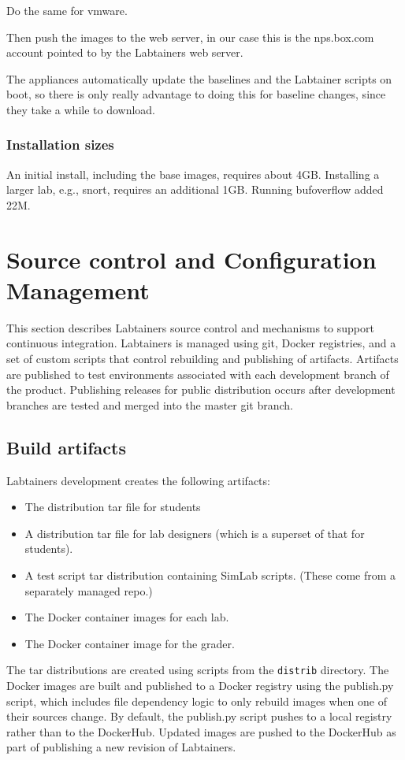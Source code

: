 \documentclass[12pt]{article}
\begin{document}
Do the same for vmware.

Then push the images to the web server, in our case this is the nps.box.com account
pointed to by the Labtainers web server.

The appliances automatically update the baselines and the Labtainer scripts on boot, so there
is only really advantage to doing this for baseline changes, since they take a while to download.

\subsubsection {Installation sizes}
An initial install, including the base images, requires about 4GB.  Installing a larger lab,
e.g., snort, requires an additional 1GB.  Running bufoverflow added 22M.

\section {Source control and Configuration Management}
\label{releases}
This section describes Labtainers source control and mechanisms to support continuous
integration.  Labtainers is managed using git, Docker registries, and a set of custom scripts that control
rebuilding and publishing of artifacts.  Artifacts are published to test environments associated with each
development branch of the product.  Publishing releases for public distribution occurs after development
branches are tested and merged into the master git branch.

\subsection{Build artifacts}
Labtainers development creates the following artifacts:
\begin{itemize}
\item The distribution tar file for students
\item A distribution tar file for lab designers (which is a superset of that for students).
\item A test script tar distribution containing SimLab scripts. (These come from a separately managed repo.)
\item The Docker container images for each lab.
\item The Docker container image for the grader.
\end{itemize}

The tar distributions are created using scripts from the {\tt distrib} directory.  The Docker images are built and published to
a Docker registry using the publish.py script, which includes file dependency logic to only rebuild images when one
of their sources change.  By default, the publish.py script pushes to a local registry rather than to the DockerHub.  
Updated images are pushed to the DockerHub as part of publishing a new revision of Labtainers.
\end{document}

